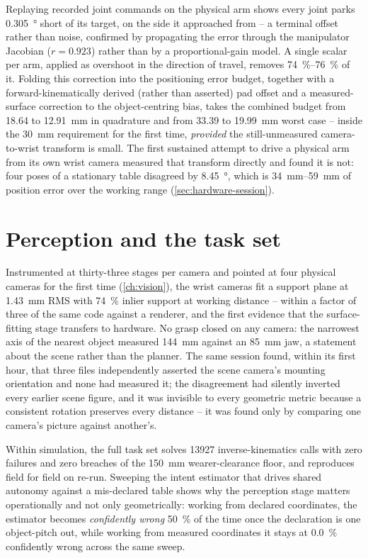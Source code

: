 Replaying recorded joint commands on the physical arm shows every joint
parks \SI{0.305}{\degree} short of its target, on the side it approached
from -- a terminal offset rather than noise, confirmed by propagating the
error through the manipulator Jacobian ($r=\num{0.923}$) rather than by a
proportional-gain model. A single scalar per arm, applied as overshoot in
the direction of travel, removes \SIrange{74}{76}{\percent} of it. Folding
this correction into the positioning error budget, together with a
forward-kinematically derived (rather than asserted) pad offset and a
measured-surface correction to the object-centring bias, takes the combined
budget from \SI{18.64}{} to \SI{12.91}{\milli\metre} in quadrature and from
\SI{33.39}{} to \SI{19.99}{\milli\metre} worst case -- inside the
\SI{30}{\milli\metre} requirement for the first time, \emph{provided} the
still-unmeasured camera-to-wrist transform is small. The first sustained
attempt to drive a physical arm from its own wrist camera measured that
transform directly and found it is not: four poses of a stationary table
disagreed by \SI{8.45}{\degree}, which is \SIrange{34}{59}{\milli\metre} of
position error over the working range (\cref{sec:hardware-session}).

\section{Perception and the task set}

Instrumented at thirty-three stages per camera and pointed at four physical
cameras for the first time (\cref{ch:vision}), the wrist cameras fit a
support plane at \SI{1.43}{\milli\metre} RMS with \SI{74}{\percent} inlier
support at working distance -- within a factor of three of the same code
against a renderer, and the first evidence that the surface-fitting stage
transfers to hardware. No grasp closed on any camera: the narrowest axis of
the nearest object measured \SI{144}{\milli\metre} against an
\SI{85}{\milli\metre} jaw, a statement about the scene rather than the
planner. The same session found, within its first hour, that three files
independently asserted the scene camera's mounting orientation and none had
measured it; the disagreement had silently inverted every earlier scene
figure, and it was invisible to every geometric metric because a consistent
rotation preserves every distance -- it was found only by comparing one
camera's picture against another's.

Within simulation, the full task set solves \num{13927} inverse-kinematics
calls with zero failures and zero breaches of the \SI{150}{\milli\metre}
wearer-clearance floor, and reproduces field for field on re-run. Sweeping
the intent estimator that drives shared autonomy against a mis-declared
table shows why the perception stage matters operationally and not only
geometrically: working from declared coordinates, the estimator becomes
\emph{confidently wrong} \SI{50}{\percent} of the time once the declaration
is one object-pitch out, while working from measured coordinates it stays at
\SI{0.0}{\percent} confidently wrong across the same sweep.

